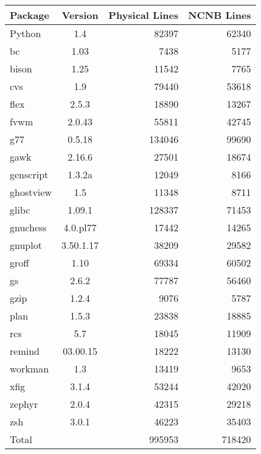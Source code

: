 \begin{tabular}{|l|c|r|r|}\hline
Package & Version & Physical Lines & NCNB Lines\\\hline\hline
Python & 1.4 & 82397 & 62340 \\\hline
bc & 1.03 & 7438 & 5177 \\\hline
bison & 1.25 & 11542 & 7765 \\\hline
cvs & 1.9 & 79440 & 53618 \\\hline
flex & 2.5.3 & 18890 & 13267 \\\hline
fvwm & 2.0.43 & 55811 & 42745 \\\hline
g77 & 0.5.18 & 134046 & 99690 \\\hline
gawk & 2.16.6 & 27501 & 18674 \\\hline
genscript & 1.3.2a & 12049 & 8166 \\\hline
ghostview & 1.5 & 11348 & 8711 \\\hline
glibc & 1.09.1 & 128337 & 71453 \\\hline
gnuchess & 4.0.pl77 & 17442 & 14265 \\\hline
gnuplot & 3.50.1.17 & 38209 & 29582 \\\hline
groff & 1.10 & 69334 & 60502 \\\hline
gs & 2.6.2 & 77787 & 56460 \\\hline
gzip & 1.2.4 & 9076 & 5787 \\\hline
plan & 1.5.3 & 23838 & 18885 \\\hline
rcs & 5.7 & 18045 & 11909 \\\hline
remind & 03.00.15 & 18222 & 13130 \\\hline
workman & 1.3 & 13419 & 9653 \\\hline
xfig & 3.1.4 & 53244 & 42020 \\\hline
zephyr & 2.0.4 & 42315 & 29218 \\\hline
zsh & 3.0.1 & 46223 & 35403 \\\hline\hline
\multicolumn{2}{|l|}{Total} & 995953 & 718420 \\\hline
\end{tabular}
